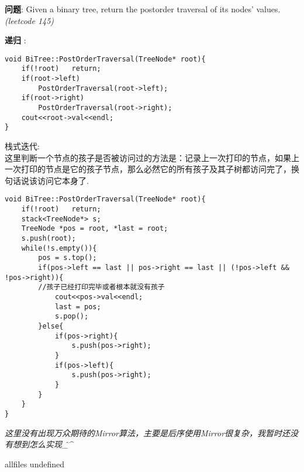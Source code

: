 \documentclass{article}
\begin{document}
\begin{CJK}{UTF8}{gbsn}     %

\else
	
\begin{description}
	\item{\textbf{问题}}: Given a binary tree, return the postorder traversal of its nodes' values. \textit{(leetcode 145)}
	\item{\textbf{递归}} : 
	\\
	\begin{lstlisting}
void BiTree::PostOrderTraversal(TreeNode* root){
	if(!root)	return;
	if(root->left)
		PostOrderTraversal(root->left);
	if(root->right)
		PostOrderTraversal(root->right);
	cout<<root->val<<endl;
}
	\end{lstlisting}
	\item{栈式迭代}: 
	\\这里判断一个节点的孩子是否被访问过的方法是：记录上一次打印的节点，如果上一次打印的节点是它的孩子节点，那么必然它的所有孩子及其子树都访问完了，换句话说该访问它本身了.
	\begin{lstlisting}
void BiTree::PostOrderTraversal(TreeNode* root){
	if(!root)	return;
	stack<TreeNode*> s;
	TreeNode *pos = root, *last = root;
	s.push(root);
	while(!s.empty()){
		pos = s.top();
		if(pos->left == last || pos->right == last || (!pos->left && !pos->right)){
		//孩子已经打印完毕或者根本就没有孩子
			cout<<pos->val<<endl;
			last = pos;
			s.pop();
		}else{
			if(pos->right){
				s.push(pos->right);
			}
			if(pos->left){
				s.push(pos->right);
			}
		}
	}
}
	\end{lstlisting}
	\textit{这里没有出现万众期待的Mirror算法，主要是后序使用Mirror很复杂，我暂时还没有想到怎么实现\^\_\^}
\end{description}

\fi

\ifx allfiles undefined
\end{CJK}
\end{document}
